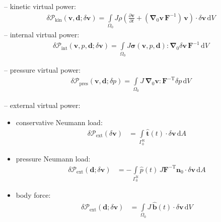 \documentclass[a4paper,12pt]{report}
\newcommand{\bs}[1]{\boldsymbol{#1}}
\newcommand{\Om}{\mathit{\Omega}}
\newcommand{\Gm}{\mathit{\Gamma}}
\begin{document}
-- kinetic virtual power:
\begin{align}
\delta \mathcal{P}_{\mathrm{kin}}(\bs{v},\bs{d};\delta\bs{v}) = \int\limits_{\Om_0} J \rho\left(\frac{\partial\bs{v}}{\partial t} + (\bs{\nabla}_{0}\bs{v}\,\bs{F}^{-1})\,\bs{v}\right) \cdot \delta\bs{v} \,\mathrm{d}V
\end{align}
-- internal virtual power:
\begin{align}
\delta \mathcal{P}_{\mathrm{int}}(\bs{v},p,\bs{d};\delta\bs{v}) = 
\int\limits_{\Om_0} J\bs{\sigma}(\bs{v},p,\bs{d}) : \bs{\nabla}_{0} \delta\bs{v}\,\bs{F}^{-1} \,\mathrm{d}V
\end{align}

-- pressure virtual power:
\begin{align}
\delta \mathcal{P}_{\mathrm{pres}}(\bs{v},\bs{d};\delta p) = 
\int\limits_{\Om_0} J\,\bs{\nabla}_{0}\bs{v} : \bs{F}^{-\mathrm{T}}\delta p\,\mathrm{d}V
\end{align}

-- external virtual power:\\
\begin{itemize}
\item conservative Neumann load:
\begin{align}
\delta \mathcal{P}_{\mathrm{ext}}(\delta\bs{v}) &= \int\limits_{\Gm_0^{\mathrm{N}}} \hat{\bs{t}}(t) \cdot \delta\bs{v} \,\mathrm{d}A \label{eq:deltaPext_neumann_ale}
\end{align}
\item pressure Neumann load:
\begin{align}
\delta \mathcal{P}_{\mathrm{ext}}(\bs{d};\delta\bs{v}) &= -\int\limits_{\Gm_0^{\mathrm{N}}} \hat{p}(t)\,J\bs{F}^{-\mathrm{T}}\bs{n}_{0} \cdot \delta\bs{v} \,\mathrm{d}A \label{eq:deltaPext_neumann_ale}
\end{align}
\item body force:
\begin{align}
\delta \mathcal{P}_{\mathrm{ext}}(\bs{d};\delta\bs{v}) &= \int\limits_{\Om_0} J\,\hat{\bs{b}}(t) \cdot \delta\bs{v} \,\mathrm{d}V \label{eq:deltaPext_body_ale}
\end{align}
\end{itemize}
\end{document}
